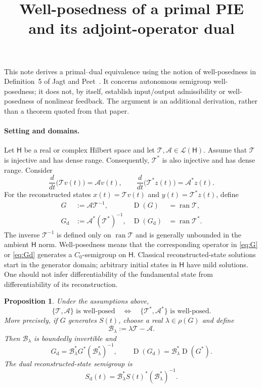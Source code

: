 \documentclass[11pt,a4paper]{article}
\title{Well-posedness of a primal PIE and its adjoint-operator dual}
\author{}
\date{}
\newtheorem{proposition}{Proposition}
\newcommand{\StateSpace}{\mathsf H}
\newcommand{\OpT}{\mathcal T}
\newcommand{\OpA}{\mathcal A}
\newcommand{\OpB}{\mathcal B_\lambda}
\DeclareMathOperator{\ran}{ran}
\DeclareMathOperator{\Dom}{D}
\begin{document}
\maketitle
\vspace{-12mm}

This note derives a primal--dual equivalence using the notion of
well-posedness in Definition~5 of Jagt and Peet~\cite{jagt}.
It concerns autonomous semigroup well-posedness; it does not, by itself,
establish input/output admissibility or well-posedness of nonlinear feedback.
The argument is an additional derivation, rather than a theorem quoted
from that paper.

\paragraph{Setting and domains.}
Let $\StateSpace$ be a real or complex Hilbert space and let
$\OpT,\OpA\in\mathcal L(\StateSpace)$. Assume that $\OpT$ is injective and has
dense range. Consequently, $\OpT^*$ is also injective and has dense range.
Consider
\begin{equation}\label{eq:pies}
 \frac{d}{dt}\bigl(\OpT v(t)\bigr)=\OpA v(t),
 \qquad
 \frac{d}{dt}\bigl(\OpT^* z(t)\bigr)=\OpA^*z(t).
\end{equation}
For the reconstructed states $x(t)=\OpT v(t)$ and $y(t)=\OpT^*z(t)$,
define
\begin{align}
 G&:=\OpA\OpT^{-1}, &\Dom(G)&=\ran\OpT,\label{eq:G}\\
 G_{\mathrm d}&:=\OpA^*(\OpT^*)^{-1},
 &\Dom(G_{\mathrm d})&=\ran\OpT^*.\label{eq:Gd}
\end{align}
The inverse $\OpT^{-1}$ is defined only on $\ran\OpT$ and is generally
unbounded in the ambient $\StateSpace$ norm. Well-posedness means that the
corresponding operator in \eqref{eq:G} or \eqref{eq:Gd} generates a
$C_0$-semigroup on $\StateSpace$. Classical reconstructed-state solutions start
in the generator domain; arbitrary initial states in $\StateSpace$ have mild
solutions. One should not infer differentiability of the fundamental
state from differentiability of its reconstruction.

\begin{proposition}\label{prop:equivalence}
Under the assumptions above,
\[
 \{\OpT,\OpA\}\text{ is well-posed}
 \quad\Longleftrightarrow\quad
 \{\OpT^*,\OpA^*\}\text{ is well-posed}.
\]
More precisely, if $G$ generates $S(t)$, choose a real
$\lambda\in\rho(G)$ and define
\begin{equation}\label{eq:B}
 \OpB:=\lambda\OpT-\OpA.
\end{equation}
Then $\OpB$ is boundedly invertible and
\begin{equation}\label{eq:similarity}
 G_{\mathrm d}=\OpB^*G^*(\OpB^*)^{-1},
 \qquad
 \Dom(G_{\mathrm d})=\OpB^*\Dom(G^*).
\end{equation}
The dual reconstructed-state semigroup is
\begin{equation}\label{eq:dual-semigroup}
 S_{\mathrm d}(t)=\OpB^*S(t)^*(\OpB^*)^{-1}.
\end{equation}
\end{proposition}
\end{document}
